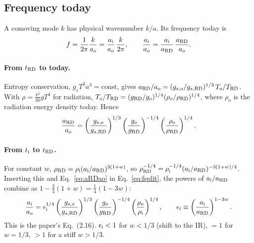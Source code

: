 \documentclass[11pt,a4paper]{article}
\begin{document}
\subsection{Frequency today}
A comoving mode $k$ has physical wavenumber $k/a$. Its frequency today is
\begin{equation}
f=\frac{1}{2\pi}\frac{k}{a_o}=\frac{a_{\rm i}}{a_o}\,\frac{k}{2\pi},
\qquad
\frac{a_{\rm i}}{a_o}=\frac{a_{\rm i}}{a_{\rm RD}}\,\frac{a_{\rm RD}}{a_o}. \label{eq:fsplit}
\end{equation}

\paragraph{From $t_{\rm RD}$ to today.} Entropy conservation, $g_{s}T^3a^3=\text{const}$, gives $a_{\rm RD}/a_o=(g_{s,o}/g_{s,\rm RD})^{1/3}\,T_o/T_{\rm RD}$. With $\rho=\frac{\pi^2}{30}gT^4$ for radiation, $T_o/T_{\rm RD}=(g_{\rm RD}/g_o)^{1/4}(\rho_o/\rho_{\rm RD})^{1/4}$, where $\rho_o$ is the radiation energy density today. Hence
\begin{equation}
\frac{a_{\rm RD}}{a_o}=\left(\frac{g_{s,o}}{g_{s,\rm RD}}\right)^{1/3}\left(\frac{g_o}{g_{\rm RD}}\right)^{-1/4}\left(\frac{\rho_o}{\rho_{\rm RD}}\right)^{1/4}. \label{eq:aRDao}
\end{equation}

\paragraph{From $t_{\rm i}$ to $t_{\rm RD}$.} For constant $w$, $\rho_{\rm RD}=\rho_{\rm i}(a_{\rm i}/a_{\rm RD})^{3(1+w)}$, so $\rho_{\rm RD}^{-1/4}=\rho_{\rm i}^{-1/4}(a_{\rm i}/a_{\rm RD})^{-3(1+w)/4}$. Inserting this and Eq.~\eqref{eq:aRDao} in Eq.~\eqref{eq:fsplit}, the powers of $a_{\rm i}/a_{\rm RD}$ combine as $1-\tfrac34(1+w)=\tfrac14(1-3w)$:
\begin{equation}
\frac{a_{\rm i}}{a_o}=\epsilon_{\rm i}^{1/4}\left(\frac{g_{s,o}}{g_{s,\rm RD}}\right)^{1/3}\left(\frac{g_o}{g_{\rm RD}}\right)^{-1/4}\left(\frac{\rho_o}{\rho_{\rm i}}\right)^{1/4},
\qquad
\epsilon_{\rm i}\equiv\left(\frac{a_{\rm i}}{a_{\rm RD}}\right)^{1-3w}. \label{eq:aiao}
\end{equation}
This is the paper's Eq.~(2.16). $\epsilon_{\rm i}<1$ for $w<1/3$ (shift to the IR), $=1$ for $w=1/3$, $>1$ for a stiff $w>1/3$.
\end{document}
